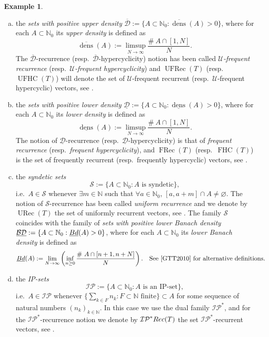\documentclass[openright,11pt]{article}
\theoremstyle{plain}
\theoremstyle{definition}
\newtheorem{example}[theorem]{Example}
\newcommand{\NN}{\mathbb{N}}
\newcommand{\IP}{\mathcal{IP}}
\newcommand{\Sc}{\mathcal{S}}
\newcommand{\Uc}{\mathcal{U}}
\newcommand{\URec}{\operatorname{URec}}
\newcommand{\FRec}{\operatorname{FRec}}
\newcommand{\UFRec}{\operatorname{UFRec}}
\newcommand{\Rec}{\textup{Rec}}
\newcommand{\FHC}{\operatorname{FHC}}
\newcommand{\UFHC}{\operatorname{UFHC}}
\newcommand{\Bdinf}{\underline{\textup{Bd}}}
\newcommand{\dsup}{\overline{\operatorname{dens}}}
\newcommand{\dinf}{\underline{\operatorname{dens}}}
\newcommand{\BDinf}{\underline{\mathcal{BD}}}
\newcommand{\Dsup}{\overline{\mathcal{D}}}
\newcommand{\Dinf}{\underline{\mathcal{D}}}
\begin{document}
\begin{example}
\begin{enumerate}[(a)]
		\item the {\em sets with positive upper density} $\Dsup := \{ A \subset \NN_0 : \dsup(A)>0 \}$, where for each $A \subset \NN_0$ its {\em upper density} is defined as
		\[
		\dsup(A) := \limsup_{N \to \infty} \dfrac{\# \ A\cap [1,N]}{N}.
		\]
		The $\Dsup$-recurrence (resp.\ $\Dsup$-hypercyclicity) notion has been called {\em $\Uc$-frequent recurrence} (resp.\ {\em $\Uc$-frequent hypercyclicity}) and $\UFRec(T)$ (resp.\ $\UFHC(T)$) will denote the set of $\Uc$-frequent recurrent (resp.\ $\Uc$-frequent hypercyclic) vectors, see \cite{Shkarin2009,BMPP2016,BMPP2019,BoGrLoPe2022,GriLo2023}.
		
		\item the {\em sets with positive lower density} $\Dinf := \{ A \subset \NN_0 : \dinf(A)>0 \}$, where for each $A \subset \NN_0$ its {\em lower density} is defined as
		\[
		\dinf(A) := \limsup_{N \to \infty} \dfrac{\# \ A\cap [1,N]}{N}.
		\]
		The notion of $\Dinf$-recurrence (resp.\ $\Dinf$-hypercyclicity) is that of {\em frequent recurrence} (resp.\ {\em frequent hypercyclicity}), and $\FRec(T)$ (resp.\ $\FHC(T)$) is the set of frequently recurrent (resp.\ frequently hypercyclic) vectors, see \cite{BaGri2006,BMPP2016,BMPP2019,BoGrLoPe2022,GriLo2023,Lopez2024_RinM}.
		
		\item the {\em syndetic sets}
		\[
		\Sc := \{ A \subset \NN_0 : A \text{ is syndetic} \},
		\]
		i.e.\ $A \in \Sc$ whenever $\exists m \in \NN$ such that $\forall a \in \NN_0$, $[a,a+m]\cap A\neq\varnothing$. The notion of $\Sc$-recurrence has been called {\em uniform recurrence} and we denote by $\URec(T)$ the set of uniformly recurrent vectors, see \cite{Furstenberg1981_book,BoGrLoPe2022,GriLo2023,Lopez2024_RinM}. The family $\Sc$ coincides with the family of {\em sets with positive lower Banach density} $\BDinf := \{ A \subset \NN_0 : \Bdinf(A)>0 \}$, where for each $A \subset \NN_0$ its {\em lower Banach density} is defined as
		\[
		\Bdinf(A) := \lim_{N \to \infty} \left( \inf_{n \geq 0} \dfrac{\# \ A\cap [n+1,n+N]}{N} \right). \quad \text{See \cite{GTT2010} for alternative definitions.}
		\]
		
		\item the {\em IP-sets}
		\[
		\IP := \{ A \subset \NN_0 : A \text{ is an IP-set} \},
		\]
		i.e.\ $A \in \IP$ whenever $\{ \sum_{k \in F} n_k : F \subset \NN \text{ finite} \} \subset A$ for some sequence of natural numbers $(n_k)_{k\in\NN}$. In this case we use the dual family $\IP^*$, and for the $\IP^*$-recurrence notion we denote by $\IP^*\Rec(T)$ the set $\IP^*$-recurrent vectors, see \cite{Furstenberg1981_book,GaMaPeOp2015,BoGrLoPe2022,GriLo2023}.
		

\end{enumerate}
\end{example}
\end{document}
